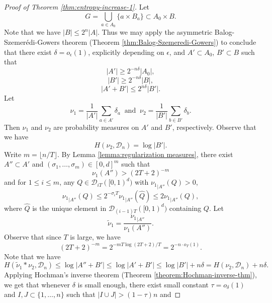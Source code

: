 \documentclass[a4paper,11pt]{amsart}
\theoremstyle{definition}
\numberwithin{equation}{section}
\def\D{\mathcal{D}}
\begin{document}
\begin{proof}[Proof of Theorem \ref{thm:entropy-increase-1}]
Let 
\[G=\bigcup_{a\in A_0}\{a\times B_a\}\subset A_0\times B.\]
Note that we have $|B|\le 2^n|A|$.  Thus we may apply the asymmetric Balog-Szemer\'edi-Gowers theorem (Theorem \ref{thm:Balog-Szemeredi-Gowers}) to conclude that there exist $\delta=o_\epsilon(1)$,  explicitly depending on $\epsilon$, and $A'\subset A_0$, $B'\subset B$ such that 
\begin{equation}\label{eq:pf-Thm-ent-inc:5}
|A'|\ge  2^{-n\delta}|A_0|,
\end{equation}
\begin{equation}\label{eq:pf-Thm-ent-inc:6}
|B'|\ge  2^{-n\delta}|B|,
\end{equation}
\begin{equation}\label{eq:pf-Thm-ent-inc:7}
|A'+B'|\le  2^{n\delta}|B'|.
\end{equation}
Let 
\begin{equation}\label{eq:pf-Thm-ent-inc:8-bis}
\nu_1=\frac{1}{|A'|}\sum_{a\in A'}\delta_{a} \  \textrm{ and } \  \nu_2=\frac{1}{|B'|}\sum_{b\in B'}\delta_{b}.
\end{equation}
Then $\nu_1$ and $\nu_2$ are probability measures on $A'$ and $B'$,  respectively.  Observe that we have
\begin{equation}\label{eq:pf-Thm-ent-inc:8}
H(\nu_2,\D_n)=\log |B'|.
\end{equation}
Write $m=\lfloor n/T\rfloor$.  
{\color{black}By Lemma \ref{lemma:regularization measures},   there exist $A''\subset A'$ and  $(\sigma_1,\ldots,\sigma_m)\in [0,d]^m$  such that 
\begin{equation}\label{eq:pf-Thm-ent-inc:9}
\nu_1(A'') > (2T+2)^{-m}
\end{equation}
and for $1\le i\le m$,  any $Q\in  \D_{iT}([0,1)^d)$ with ${\nu_1}_{|A''}(Q)>0$,   
\begin{equation}\label{eq:pf-Thm-ent-inc:10}
{\nu_1}_{|A''}(Q)\le 2^{-\sigma_i T} {\nu_1}_{|A''}(\widehat{Q})  \le 2{\nu_1}_{|A''}(Q),
\end{equation}
where $\widehat{Q}$ is the unique element in $ \D_{(i-1)T}([0,1)^d)$ containing $Q$.}
Let \[\tilde{\nu}_1=\frac{{\nu_1}_{|A''}}{\nu_1(A'')}.\]
Observe that since $T$ is large, we have
\begin{equation}\label{eq:pf-Thm-ent-inc:11}
(2T+2)^{-m}=2^{-mT\log (2T+2)/T} = 2^{-n \cdot o_T(1)}.
\end{equation}
Note that we have
\[
H(\tilde{\nu}_1*\nu_2,\D_n)\le \log |A''+B'| \le \log |A'+B'|\le \log|B'|+n\delta=H(\nu_2,\D_n)+n\delta.
\]
Applying Hochman's inverse theorem (Theorem \ref{theorem:Hochman-inverse-thm}),  we get that whenever $\delta$ is small enough,  there exist small constant $\tau=o_{\delta}(1)$ and $I,J\subset \{1,\ldots,n\}$ such that $|I\cup J|>(1-\tau)n$ and 

\end{proof}
\end{document}
